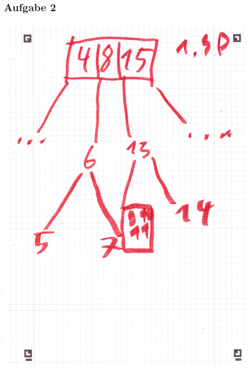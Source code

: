 \documentclass{article}
\begin{document}
	\subsection*{Aufgabe 2}
	\includegraphics[width=\linewidth]{A30201} \\ \\
\end{document}
